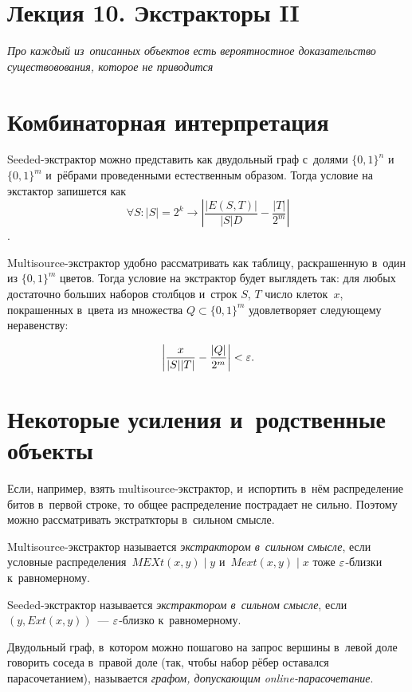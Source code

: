 \documentclass{article}
\begin{document}
\section*{Лекция 10. Экстракторы II}
\resetcntrs

\emph{Про каждый из~описанных объектов есть вероятностное доказательство
существовования, которое не приводится}

\section{Комбинаторная интерпретация}

Seeded-экстрактор можно представить как двудольный граф с~долями $\{0, 1\}^n$
и~$\{0, 1\}^m$ и~рёбрами проведенными естественным образом. Тогда условие на
экстактор запишется как
$$ \forall S: |S| = 2^k \rightarrow \left|\frac{|E(S,T)|}{|S|D} -
\frac{|T|}{2^m} \right|$$.

Multisource-экстрактор удобно рассматривать как таблицу, раскрашенную в~один из
$\{0, 1\}^m$ цветов. Тогда условие на экстрактор будет выглядеть так: для
любых достаточно больших наборов столбцов и~строк $S$, $T$ число клеток~$x$,
покрашенных в~цвета из множества $Q \subset \{0, 1\}^m$ удовлетворяет следующему
неравенству:

$$\left| \frac{x}{|S||T|} - \frac{|Q|}{2^m} \right| < \varepsilon.$$

\section{Некоторые усиления и~родственные объекты}

Если, например, взять multisource-экстрактор, и~испортить в~нём распределение
битов в~первой строке, то общее распределение пострадает не сильно. Поэтому
можно рассматривать экстраткторы в~сильном смысле.

\begin{definition}
	Multisource-экстрактор называется \emph{экстрактором в~сильном смысле}, если
	условные распределения~$MEXt(x,y) \mid y$ и~$Mext(x, y) \mid x$ тоже
	$\varepsilon$-близки к~равномерному.
\end{definition}

\begin{definition}
	Seeded-экстрактор называется \emph{экстрактором в~сильном смысле}, если
	$(y, Ext(x, y))$~--- $\varepsilon$-близко к~равномерному.
\end{definition}

\begin{definition}
	Двудольный граф, в~котором можно пошагово на запрос вершины в~левой доле
	говорить соседа в~правой доле (так, чтобы набор рёбер оставался
	парасочетанием), называется \emph{графом, допускающим online-парасочетание}.
\end{definition}
\end{document}
